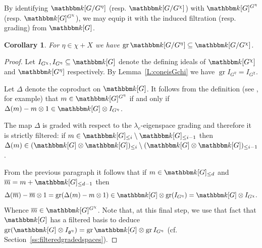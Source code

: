 \documentclass[twoside,12pt,reqno]{amsart}
\newtheorem{Corollary}[Theorem]{Corollary}
\theoremstyle{remark}
\numberwithin{equation}{section}
\def\bar{\overline}
\def\k{{\mathbbm k}}
\def\gr{\operatorname{gr}}
\def\g{{\mathfrak g}}
\begin{document}
By identifying $\k[G/G^\eta]$ (resp. $\k[G/G^\chi]$) with $\k[G]^{G^\eta}$ (resp. $\k[G]^{G^\chi}$), we may equip it with the induced filtration (resp. grading) from $\k[G]$.

\begin{Corollary}
    \label{C:gradedHopfcentraliser}
        For $\eta \in \chi + X$ we have $\gr \k[G / G^\eta]\subseteq \k[G / G^\chi]$.
    \end{Corollary}

\begin{proof}
    Let $I_{G^\chi}, I_{G^\eta} \subseteq \k[G]$ denote the defining ideals of $\k[G^\chi]$ and $\k[G^\eta]$ respectively. By Lemma~\ref{L:coneisGchi} we have $\gr I_{G^\eta} = I_{G^\chi}$.

    Let $\Delta$ denote the coproduct on $\k[G]$. It follows from the definition (see \cite[I.2.10(2)]{JanRAGS}, for example) that  $m \in \k[G]^{G^\eta}$ if and only if $\Delta(m) - m\otimes 1 \in \k[G] \otimes I_{G^\eta}$. 
    
    The map $\Delta$ is graded with respect to the $\lambda_e$-eigenspace grading and therefore it is strictly filtered: if $m \in \k[G]_{\leq i} \setminus \k[G]_{\leq i-1}$ then $\Delta(m) \in (\k[G] \otimes \k[G])_{\leq i} \setminus (\k[G] \otimes \k[G])_{\leq i-1}$.

    From the previous paragraph it follows that if $m \in \k[G]_{\le d}$ and $\bar m = m + \k[G]_{\le d-1}$ then $$\Delta(\bar m) - \bar m \otimes 1= \gr ( \Delta(m) - m \otimes 1)   \in \k[G] \otimes \gr (I_{G^\eta}) = \k[G] \otimes I_{G^\chi}.$$
    Whence $\bar m \in \k[G]^{G^\chi}$. Note that, at this final step, we use that fact that $\k[G]$ has a filtered basis to deduce $\gr(\k[G] \otimes I_{\g^\eta}) = \gr \k[G] \otimes \gr I_{G^\eta}$ (cf. Section~\ref{ss:filteredgradedspaces}). 
\end{proof}
\end{document}
